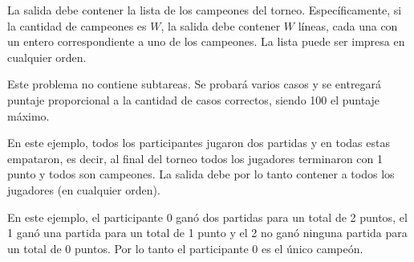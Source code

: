 \documentclass{oci}
\begin{document}
\begin{outputDescription}
  La salida debe contener la lista de los campeones del torneo.
  Específicamente, si la cantidad de campeones es $W$, la salida debe contener
  $W$ líneas, cada una con un entero correspondiente a uno de los campeones.
  La lista puede ser impresa en cualquier orden.
\end{outputDescription}

\begin{scoreDescription}
  Este problema no contiene subtareas.
  Se probará varios casos y se entregará puntaje proporcional a la cantidad de casos correctos,
  siendo 100 el puntaje máximo.
\end{scoreDescription}

\begin{sampleDescription}
\vspace{-1em}
En este ejemplo, todos los participantes jugaron dos partidas y en todas estas empataron, es decir,
al final del torneo todos los jugadores terminaron con 1 punto y todos son campeones.
La salida debe por lo tanto contener a todos los jugadores (en cualquier orden).
\vspace{1em}

\vspace{-1em}
En este ejemplo, el participante 0 ganó dos partidas para un total de 2 puntos, el 1 ganó una partida
para un total de 1 punto y el 2 no ganó ninguna partida para un total de 0 puntos.
Por lo tanto el participante 0 es el único campeón.
\end{sampleDescription}
\vspace{1em}
\end{document}
